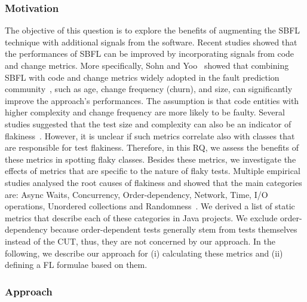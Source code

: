 \subsubsection{Motivation}
The objective of this question is to explore the benefits of augmenting the SBFL technique with additional signals from the software.
Recent studies showed that the performances of SBFL can be improved by incorporating signals from code and change metrics.
More specifically, Sohn and Yoo~\cite{sohn-TSE} showed that combining SBFL with code and change metrics widely adopted in the fault prediction community~\cite{McI:2018:tse}, such as age, change frequency (\ie churn), and size, can significantly improve the approach's performances.
The assumption is that code entities with higher complexity and change frequency are more likely to be faulty.
Several studies suggested that the test size and complexity can also be an indicator of flakiness~\cite{Pinto2020,King2018,Camara2021a}. %
However, it is unclear if such metrics correlate also with classes that are responsible for test flakiness.
Therefore, in this RQ, we assess the benefits of these metrics in spotting flaky classes.
Besides these metrics, we investigate the effects of metrics that are specific to the nature of flaky tests.
Multiple empirical studies analysed the root causes of flakiness and showed that the main categories are: Async Waits, Concurrency, Order-dependency, Network, Time, I/O operations, Unordered collections and Randomness~\cite{Luo2014,Parry2021,Lam2020a,Gruber2021}.
We derived a list of static metrics that describe each of these categories in Java projects.
We exclude order-dependency because order-dependent tests generally stem from tests themselves instead of the CUT, thus, they are not concerned by our approach.
In the following, we describe our approach for (i) calculating these metrics and (ii) defining a FL formulae based on them.

\subsubsection{Approach}

